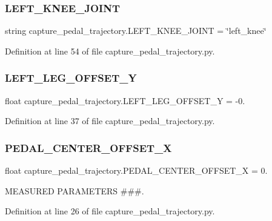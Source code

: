 \subsubsection{\texorpdfstring{LEFT\_KNEE\_JOINT}{LEFT\_KNEE\_JOINT}}
{\footnotesize\ttfamily string capture\+\_\+pedal\+\_\+trajectory.\+L\+E\+F\+T\+\_\+\+K\+N\+E\+E\+\_\+\+J\+O\+I\+NT = \char`\"{}left\+\_\+knee\char`\"{}}



Definition at line 54 of file capture\+\_\+pedal\+\_\+trajectory.\+py.

\mbox{\label{namespacecapture__pedal__trajectory_a624e3b2ffb27de7ac8ef0f742d2902c5}} 
\subsubsection{\texorpdfstring{LEFT\_LEG\_OFFSET\_Y}{LEFT\_LEG\_OFFSET\_Y}}
{\footnotesize\ttfamily float capture\+\_\+pedal\+\_\+trajectory.\+L\+E\+F\+T\+\_\+\+L\+E\+G\+\_\+\+O\+F\+F\+S\+E\+T\+\_\+Y = -\/0.}



Definition at line 37 of file capture\+\_\+pedal\+\_\+trajectory.\+py.

\mbox{\label{namespacecapture__pedal__trajectory_a3d0288c92be21566c30d330ec9b04ddf}} 
\subsubsection{\texorpdfstring{PEDAL\_CENTER\_OFFSET\_X}{PEDAL\_CENTER\_OFFSET\_X}}
{\footnotesize\ttfamily float capture\+\_\+pedal\+\_\+trajectory.\+P\+E\+D\+A\+L\+\_\+\+C\+E\+N\+T\+E\+R\+\_\+\+O\+F\+F\+S\+E\+T\+\_\+X = 0.}



M\+E\+A\+S\+U\+R\+ED P\+A\+R\+A\+M\+E\+T\+E\+RS \#\#\#. 



Definition at line 26 of file capture\+\_\+pedal\+\_\+trajectory.\+py.

